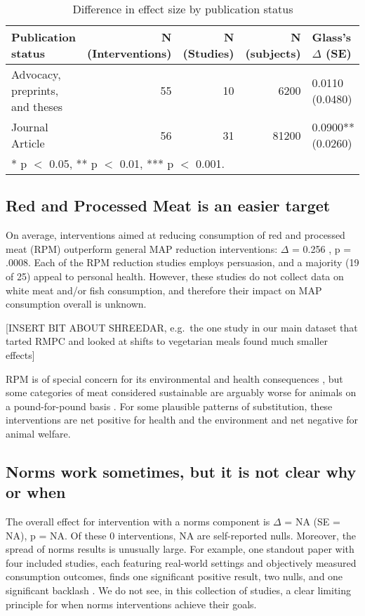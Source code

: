 \documentclass[sn-nature,pdflatex]{sn-jnl}
\begin{document}
\begin{table}[!h]
\centering
\caption{\label{tab:table_three}Difference in effect size by publication status}
\centering
\begin{tabular}[t]{lrrrl}
\toprule
Publication status & N (Interventions) & N (Studies) & N (subjects) & Glass's $\Delta$ (SE)\\
\midrule
Advocacy, preprints, and theses & 55 & 10 & 6200 & 0.0110 (0.0480)\\
Journal Article & 56 & 31 & 81200 & 0.0900** (0.0260)\\
\bottomrule
\multicolumn{5}{l}{\rule{0pt}{1em}* p $<$ 0.05, ** p $<$ 0.01, *** p $<$ 0.001.}\\
\end{tabular}
\end{table}

\subsection{Red and Processed Meat is an easier target}\label{sec2.3}

On average, interventions aimed at reducing consumption of red and
processed meat (RPM) outperform general MAP reduction interventions:
\(\Delta\) = 0.256 , p = .0008. Each of the RPM
reduction studies employs persuasion, and a majority (19 of 25) appeal
to personal health. However, these studies do not collect data on white
meat and/or fish consumption, and therefore their impact on MAP
consumption overall is unknown.

{[}INSERT BIT ABOUT SHREEDAR, e.g.~the one study in our main dataset
that tarted RMPC and looked at shifts to vegetarian meals found much
smaller effects{]}

RPM is of special concern for its environmental and health consequences
\citep{grummon2023}, but some categories of meat considered sustainable
are arguably worse for animals on a pound-for-pound basis
\citep{mathur2022ethical}. For some plausible patterns of substitution,
these interventions are net positive for health and the environment and
net negative for animal welfare.

\subsection{Norms work sometimes, but it is not clear why or
when}\label{sec2.4}

The overall effect for intervention with a norms component is \(\Delta\)
= NA (SE = NA), p = NA. Of these 0 interventions, NA are self-reported
nulls. Moreover, the spread of norms results is unusually large. For
example, one standout paper with four included studies, each featuring
real-world settings and objectively measured consumption outcomes, finds
one significant positive result, two nulls, and one significant backlash
\citep{sparkman2020}. We do not see, in this collection of studies, a
clear limiting principle for when norms interventions achieve their
goals.
\end{document}
